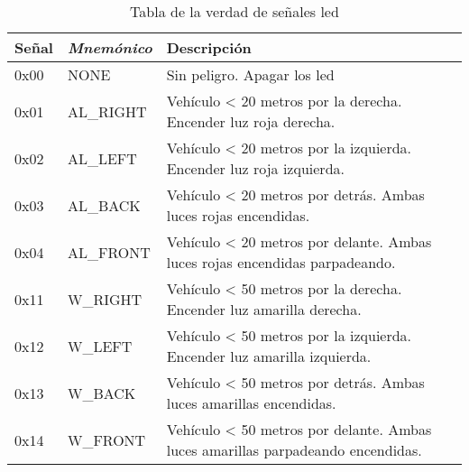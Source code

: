 \begin{table}[H]
	\centering
	\caption{Tabla de la verdad de señales led}\label{tab:tablaVerdadLED}
	\begin{tabular}{lll}
		\toprule
		\textbf{Señal} & \emph{Mnemónico} & Descripción \\
		\midrule
		0x00 & NONE    & Sin peligro. Apagar los led \\
		0x01 & AL\_RIGHT & Vehículo < 20 metros por la derecha. Encender luz
		roja derecha. \\
		0x02 & AL\_LEFT & Vehículo < 20 metros por la izquierda. Encender luz
		roja izquierda. \\
		0x03 & AL\_BACK & Vehículo < 20 metros por detrás. Ambas luces rojas
		encendidas. \\
		0x04 & AL\_FRONT & Vehículo < 20 metros por delante. Ambas luces rojas
		encendidas parpadeando. \\
		0x11 & W\_RIGHT & Vehículo < 50 metros por la derecha. Encender luz
		amarilla derecha. \\
		0x12 & W\_LEFT & Vehículo < 50 metros por la izquierda. Encender luz
		amarilla izquierda. \\
		0x13 & W\_BACK & Vehículo < 50 metros por detrás. Ambas luces amarillas
		encendidas. \\
		0x14 & W\_FRONT & Vehículo < 50 metros por delante. Ambas luces amarillas
		parpadeando encendidas.\\
		\bottomrule
	\end{tabular}
\end{table}

